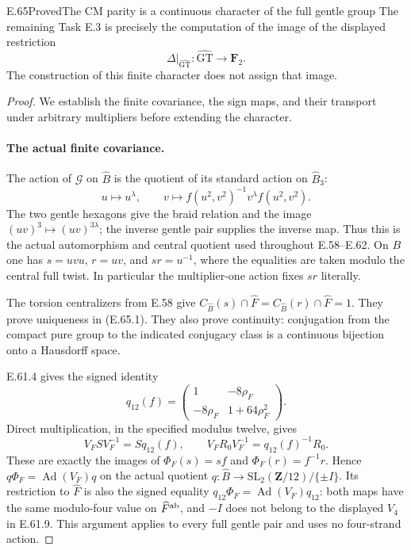 \begin{statement}{E.65}{Proved}{The CM parity is a continuous character of the full gentle group}
The remaining Task E.3 is precisely the computation of the image of
the displayed restriction
\[
              \Delta|_{\widehat{\mathrm{GT}}}:
                         \widehat{\mathrm{GT}}\longrightarrow\mathbf F_2.
 \tag{E.65.7}
\]
The construction of this finite character does not assign that image.
\end{statement}
\begin{proof}
We establish the finite covariance, the sign maps, and their transport
under arbitrary multipliers before extending the character.

\paragraph{The actual finite covariance.}
The action of $\mathcal G$ on $\widehat B$ is the quotient of its
standard action on $\widehat B_3$:
\[
 u\longmapsto u^\lambda,\qquad
 v\longmapsto f(u^2,v^2)^{-1}v^\lambda f(u^2,v^2).
 \tag{E.65.8}
\]
The two gentle hexagons give the braid relation and the image
$(uv)^3\mapsto(uv)^{3\lambda}$; the inverse gentle pair supplies
the inverse map. Thus this is the actual automorphism and central
quotient used throughout E.58--E.62. On $B$ one has
$s=uvu$, $r=uv$, and $sr=u^{-1}$, where the equalities are taken
modulo the central full twist. In particular the multiplier-one
action fixes $sr$ literally.

The torsion centralizers from E.58 give
$C_{\widehat B}(s)\cap\widehat F=
C_{\widehat B}(r)\cap\widehat F=1$.
They prove uniqueness in \textup{(E.65.1)}. They also prove
continuity: conjugation from the compact pure group to the indicated
conjugacy class is a continuous bijection onto a Hausdorff space.

E.61.4 gives the signed identity
\[
 q_{12}(f)=
 \begin{pmatrix}1&-8\rho_F\\-8\rho_F&1+64\rho_F^2\end{pmatrix}.
 \tag{E.65.9}
\]
Direct multiplication, in the specified modulus twelve, gives
\[
 V_FS V_F^{-1}=S q_{12}(f),\qquad
 V_FR_0V_F^{-1}=q_{12}(f)^{-1}R_0.
 \tag{E.65.10}
\]
These are exactly the images of $\Phi_F(s)=sf$ and
$\Phi_F(r)=f^{-1}r$. Hence
$q\Phi_F=\operatorname{Ad}(V_F)q$ on the actual quotient
$q:\widehat B\to\mathrm{SL}_2(\mathbf Z/12)/\{\pm I\}$.
Its restriction to $\widehat F$ is also the signed equality
$q_{12}\Phi_F=\operatorname{Ad}(V_F)q_{12}$: both maps have
the same modulo-four value on $\widehat F^{\rm ab}$, and
$-I$ does not belong to the displayed $V_4$ in E.61.9.
This argument applies to every full gentle pair and uses no
four-strand action.


\end{proof}
